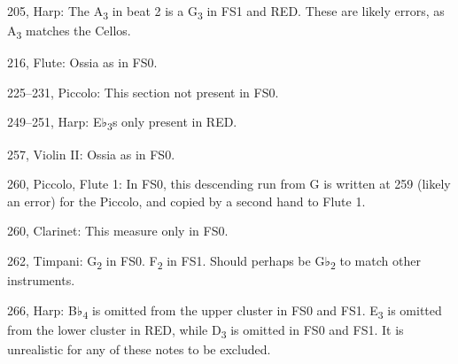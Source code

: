 \documentclass[twoside]{article}
\begin{document}
\begin{hangparas}{15pt}{1}
\begin{multicols}{2}
205, Harp: The A\textsubscript{3} in beat 2 is a G\textsubscript{3} in FS1 and RED. These are likely errors, as A\textsubscript{3} matches the Cellos.

216, Flute: Ossia as in FS0.

225--231, Piccolo: This section not present in FS0.

249--251, Harp: E♭\textsubscript{3}s only present in RED.

257, Violin II: Ossia as in FS0.

260, Piccolo, Flute 1: In FS0, this descending run from G is written at 259 (likely an error) for the Piccolo, and copied by a second hand to Flute 1.

260, Clarinet: This measure only in FS0.

262, Timpani: G\textsubscript{2} in FS0. F\textsubscript{2} in FS1. Should perhaps be G♭\textsubscript{2} to match other instruments.

266, Harp: B♭\textsubscript{4} is omitted from the upper cluster in FS0 and FS1. E\textsubscript{3} is omitted from the lower cluster in RED, while D\textsubscript{3} is omitted in FS0 and FS1. It is unrealistic for any of these notes to be excluded.

\end{multicols}

\end{hangparas}
\end{document}
